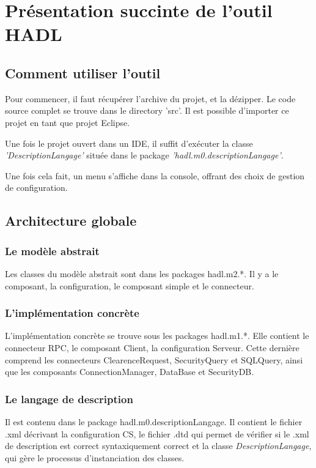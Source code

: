 \chapter{Présentation succinte de l'outil HADL}

\section{Comment utiliser l'outil}

Pour commencer, il faut récupérer l'archive du projet, et la dézipper. Le code source complet se trouve dans le directory 'src'.
Il est possible d'importer ce projet en tant que projet Eclipse.

Une fois le projet ouvert dans un IDE, il suffit d'exécuter la classe
\emph{'DescriptionLangage'} située dans le package
\emph{'hadl.m0.descriptionLangage'}.

Une fois cela fait, un menu s'affiche dans la console, offrant des choix de
gestion de configuration.

\section{Architecture globale}
\subsection{Le modèle abstrait}
Les classes du modèle abstrait sont dans les packages hadl.m2.*. Il y a le
composant, la configuration, le composant simple et le connecteur.
\subsection{L'implémentation concrète}
L'implémentation concrète se trouve sous les packages hadl.m1.*. Elle contient
le connecteur RPC, le composant Client, la configuration Serveur. Cette dernière
comprend les connecteurs ClearenceRequest, SecurityQuery et SQLQuery, ainsi que
les composants ConnectionManager, DataBase et SecurityDB.
\subsection{Le langage de description}
Il est contenu dans le package hadl.m0.descriptionLangage. Il contient le
fichier .xml décrivant la configuration CS, le fichier .dtd qui permet de
vérifier si le .xml de description est correct syntaxiquement correct et la
classe \emph{DescriptionLangage}, qui gère le processus d'instanciation des
classes.


